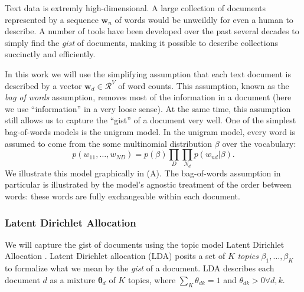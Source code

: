   Text data is extremly high-dimensional.  A large collection of
  documents represented by a sequence $\bm w_n$ of words would be
  unweildly for even a human to describe.  A number of tools have been
  developed over the past several decades to simply find the
  \emph{gist} of documents, making it possible to describe collections
  succinctly and efficiently.

  In this work we will use the simplifying assumption that each text
  document is described by a vector $\bm w_d \in \mathcal{R}^V$ of
  word counts.  This assumption, known as the \emph{bag of words}
  assumption, removes most of the information in a document (here we
  use ``information'' in a very loose sense).  At the same time, this
  assumption still allows us to capture the ``gist'' of a document
  very well. One of the simplest bag-of-words models is the unigram
  model. In the unigram model, every word is assumed to come from the
  some multinomial distribution $\beta$ over the vocabulary:
  \[
    p(w_{11}, \ldots, w_{ND}) = p(\beta) \prod_D \prod_{N_d} p(w_{nd} |
  \beta). \]
  We illustrate this model graphically in
   (A).  The bag-of-words assumption in
  particular is illustrated by the model's agnostic treatment of the
  order between words: these words are fully exchangeable within each
  document.

\subsubsection{Latent Dirichlet Allocation}
We will capture the gist of documents using the topic model Latent
Dirichlet Allocation \cite{blei:2003}.  Latent Dirichlet allocation
(LDA) posits a set of $K$ \emph{topics} $\beta_1, \ldots, \beta_K$ to
formalize what we mean by the \emph{gist} of a document.  LDA
describes each document $d$ as a mixture $\bm \theta_d$ of $K$ topics, where $\sum_K \theta_{dk} = 1$ and $\theta_{dk} > 0
\forall d,k$.

